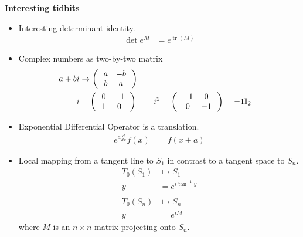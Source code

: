 \documentclass[12pt,a4paper]{report}
\begin{document}
\newpage
\textbf{\Large{Interesting tidbits}}

\begin{itemize}
	\item Interesting determinant identity.
	\begin{align*}
		\det e^M &= e^{\operatorname{tr}(M)}
	\end{align*}
	
	\item Complex numbers as two-by-two matrix
	\begin{align*}
		a + bi &\to \left (\,  \begin{array}{c c} a&-b \\ b & a \end{array}  \,\right )\\
		i &= \left (\,  \begin{array}{c c} 0&-1 \\ 1 & 0 \end{array}  \,\right ) & \quad i^2 &= \left (\,  \begin{array}{c c} -1&0 \\ 0 & -1 \end{array}  \,\right ) = -1\mathbb{I}_2
	\end{align*}
	\item Exponential Differential Operator is a translation.
	\begin{align*}
		e^{a\frac{d}{dx}}f(x) &= f(x+a)
	\end{align*}
	
	\item Local mapping from a tangent line to $S_1$ in contrast to a tangent space to $S_n$.
	\begin{align*}
		T_0(S_1) &\mapsto S_1 \\
			y &= e^{i\tan^{-1} y} \\
			\\
			T_0(S_n) &\mapsto S_n \\
				y &= e^{iM}
	\end{align*}where $M$ is an $n\times n$ matrix projecting onto $S_n$.
\end{itemize}
\end{document}
